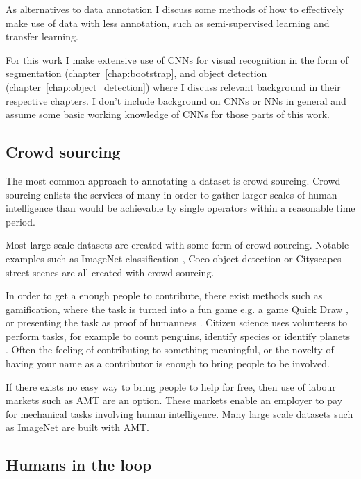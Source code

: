 As alternatives to data annotation I discuss some methods of how to effectively make use of data with less annotation, such as semi-supervised learning and transfer learning. 

For this work I make extensive use of \gls{CNN}s for visual recognition in the form of segmentation (chapter~\ref{chap:bootstrap}, and object detection (chapter~\ref{chap:object_detection}) where I discuss relevant background in their respective chapters. I don't include background on \gls{CNN}s or \gls{NN}s in general and assume some basic working knowledge of \gls{CNN}s for those parts of this work.


\subsection {Crowd sourcing}

The most common approach to annotating a dataset is crowd sourcing. Crowd sourcing enlists the services of many in order to gather larger scales of human intelligence than would be achievable by single operators within a reasonable time period.

Most large scale datasets are created with some form of crowd sourcing. Notable examples such as ImageNet classification \cite{JiaDeng2009}, Coco object detection \cite{Lin2014} or Cityscapes street scenes \cite{Cordts2016} are all created with crowd sourcing. 

In order to get a enough people to contribute, there exist methods such as gamification, where the task is turned into a fun game  e.g. a game Quick Draw \cite{Ha2017}, or presenting the task as proof of humanness \cite{Goodfellow2013a}. Citizen science uses volunteers to perform tasks, for example to count penguins, identify species or identify planets \cite{Simpson2014, Masters2016}. Often the feeling of contributing to something meaningful, or the novelty of having your name as a contributor is enough to bring people to be involved.

If there exists no easy way to bring people to help for free, then use of labour markets such as \gls{AMT} are an option. These markets enable an employer to pay for mechanical tasks involving human intelligence. Many large scale datasets such as ImageNet \cite{Russakovsky2015} are built with \gls{AMT}. 


\subsection{Humans in the loop}

